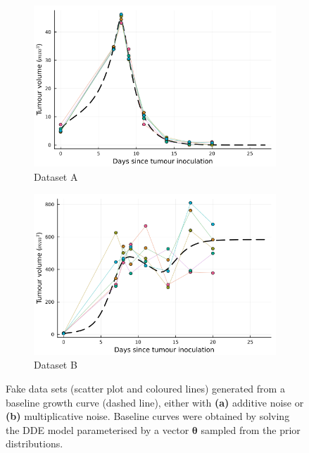 \documentclass[11pt]{article}
\begin{document}
\begin{figure}[!h]
    \centering
    \begin{subfigure}{.5\linewidth}
        \centering\includegraphics[scale=0.4]{model_validation/fd_1.png}
        \caption{Dataset A}
    \end{subfigure}%
    \begin{subfigure}{.5\linewidth}
        \centering\includegraphics[scale=0.4]{model_validation/fd_2.png}
        \caption{Dataset B}
    \end{subfigure}
    \caption{Fake data sets (scatter plot and coloured lines) generated from a baseline growth curve (dashed line), either with \textbf{(a)} additive noise or \textbf{(b)} multiplicative noise. Baseline curves were obtained by solving the DDE model parameterised by a vector $\boldsymbol{\theta}$ sampled from the prior distributions.}
    \label{fig:fd_1}
\end{figure}
\end{document}
